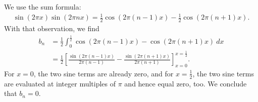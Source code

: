 \documentclass[11pt]{article}
\begin{document}
\begin{solution}
\begin{itemize}
        We use the sum formula:
        \begin{align*}
            \sin( 2\pi x) \sin(2\pi n x)
            =
            \frac{1}{2}
            \cos( 2\pi (n-1) x)
            -
            \frac{1}{2}
            \cos( 2\pi (n+1) x)
            .
        \end{align*}
        With that observation, we find 
        \begin{align*}
            b_n 
            &
            =
            \frac{1}{2}
            \int_{0}^{\frac 1 2} 
            \cos( 2\pi (n-1) x)
            -
            \cos( 2\pi (n+1) x)
            \ dx
            \\&
            =
            \frac{1}{2}
            \left[ 
            \frac{ \sin( 2\pi (n-1) x) }{ 2\pi (n-1)}
            -
            \frac{ \sin( 2\pi (n+1) x) }{ 2\pi (n+1)}
            \right]_{x=0}^{x=\frac 1 2}
            .
        \end{align*}
        For $x=0$, the two sine terms are already zero, and for $x=\frac 1 2$, the two sine terms are evaluated at integer multiples of $\pi$ and hence equal zero, too. 
        We conclude that $b_n = 0$. 
        

\end{itemize}
\end{solution}
\end{document}
